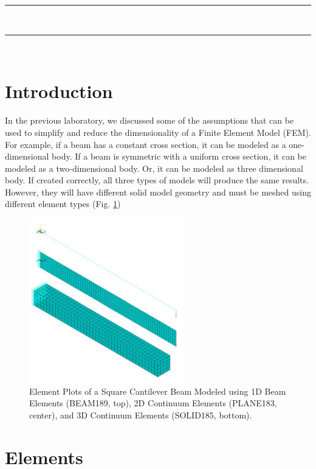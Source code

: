 \documentclass[letterpaper,pdftex]{article}
\begin{document}
\noindent
\textcolor{gray}{\rule{\textwidth}{0.5pt}}\\
\renewcommand{\tablename}{Tabla}
\renewcommand{\arraystretch}{1.2}
\renewcommand\contentsname{Outline}
\tableofcontents

\noindent
\textcolor{gray}{\rule{\textwidth}{0.5pt}}\\

\section{Introduction}

In the previous laboratory, we discussed some of the assumptions that can be used to simplify and reduce the dimensionality of a Finite Element Model (FEM). For example, if a beam has a constant cross section, it can be modeled as a one-dimensional body. If a beam is symmetric with a uniform cross section, it can be modeled as a two-dimensional body. Or, it can be modeled as three dimensional body. If created correctly, all three types of models will produce the same results. However, they will have different solid model geometry and must be meshed using different element types (Fig. \ref{fig:cantilever})

\begin{figure}[h]
   \centering
   \includegraphics[width=0.6\textwidth]{cantileverbeam}
   \caption{Element Plots of a Square Cantilever Beam Modeled using 1D Beam Elements (BEAM189, top), 2D Continuum Elements (PLANE183, center), and 3D Continuum Elements (SOLID185, bottom).}
   \label{fig:cantilever}
\end{figure}

\section{Elements}
\end{document}
